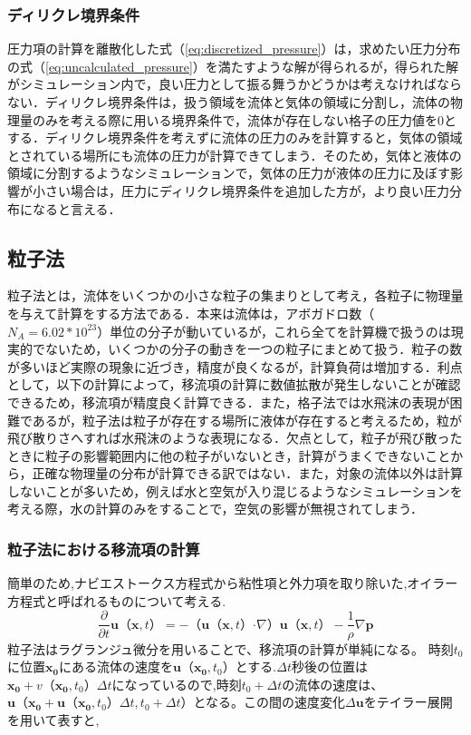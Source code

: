 \documentclass[a4j,12pt]{jreport}
\begin{document}
\subsubsection{ディリクレ境界条件} \label{subsec:Dirichlet}
圧力項の計算を離散化した式（\ref{eq:discretized_pressure}）は，求めたい圧力分布の式（\ref{eq:uncalculated_pressure}）を満たすような解が得られるが，得られた解がシミュレーション内で，良い圧力として振る舞うかどうかは考えなければならない．ディリクレ境界条件は，扱う領域を流体と気体の領域に分割し，流体の物理量のみを考える際に用いる境界条件で，流体が存在しない格子の圧力値を$0$とする．ディリクレ境界条件を考えずに流体の圧力のみを計算すると，気体の領域とされている場所にも流体の圧力が計算できてしまう．そのため，気体と液体の領域に分割するようなシミュレーションで，気体の圧力が液体の圧力に及ぼす影響が小さい場合は，圧力にディリクレ境界条件を追加した方が，より良い圧力分布になると言える．

\subsection{粒子法} \label{subsec:particle}
粒子法とは，流体をいくつかの小さな粒子の集まりとして考え，各粒子に物理量を与えて計算をする方法である．本来は流体は，アボガドロ数（$N_A = 6.02*10^{23}$）単位の分子が動いているが，これら全てを計算機で扱うのは現実的でないため，いくつかの分子の動きを一つの粒子にまとめて扱う．粒子の数が多いほど実際の現象に近づき，精度が良くなるが，計算負荷は増加する．利点として，以下の計算によって，移流項の計算に数値拡散が発生しないことが確認できるため，移流項が精度良く計算できる．また，格子法では水飛沫の表現が困難であるが，粒子法は粒子が存在する場所に液体が存在すると考えるため，粒が飛び散りさへすれば水飛沫のような表現になる．欠点として，粒子が飛び散ったときに粒子の影響範囲内に他の粒子がいないとき，計算がうまくできないことから，正確な物理量の分布が計算できる訳ではない．また，対象の流体以外は計算しないことが多いため，例えば水と空気が入り混じるようなシミュレーションを考える際，水の計算のみをすることで，空気の影響が無視されてしまう．
\subsubsection{粒子法における移流項の計算} \label{subsec:particleadvect}
簡単のため,ナビエストークス方程式から粘性項と外力項を取り除いた,オイラー方程式と呼ばれるものについて考える.
$$\frac{\partial}{\partial t}\bm{u}（\bm{x},t） = -（\bm{u}（\bm{x},t）\boldsymbol{\cdot}\nabla）\bm{u}（\bm{x},t） - \frac{1}{\rho}\nabla \bm{p}$$
粒子法はラグランジュ微分を用いることで、移流項の計算が単純になる。
時刻$t_0$に位置$\bm{x_0}$にある流体の速度を$\bm{u}（\bm{x_0},t_0）$とする.$\varDelta t$秒後の位置は$\bm{x_0}+v（\bm{x_0},t_0）\varDelta t$になっているので,時刻$t_0+\varDelta t$の流体の速度は、$\bm{u}（\bm{x_0}+\bm{u}（\bm{x_0},t_0）\varDelta t,t_0+\varDelta t）$となる。この間の速度変化$\varDelta \bm{u}$をテイラー展開を用いて表すと,
\end{document}
